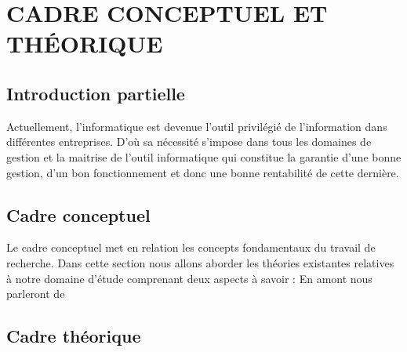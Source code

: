 \chapter[CADRE CONCEPTUEL ET THÉORIQUE]{CADRE CONCEPTUEL ET THÉORIQUE}
    \section{Introduction partielle}
    Actuellement, l’informatique est devenue l’outil privilégié de l’information dans
    différentes entreprises. D’où sa nécessité s’impose dans tous les domaines de gestion et la
    maitrise de l’outil informatique qui constitue la garantie d’une bonne gestion, d’un bon
    fonctionnement et donc une bonne rentabilité de cette dernière.
    \section[Cadre Conceptuel]{Cadre conceptuel}
    Le cadre conceptuel met en relation les concepts fondamentaux du travail de
    recherche. Dans cette section nous allons aborder les théories existantes relatives à notre
    domaine d’étude comprenant deux aspects à savoir : En amont nous parleront de
    \section[Cadre théorique]{Cadre théorique}